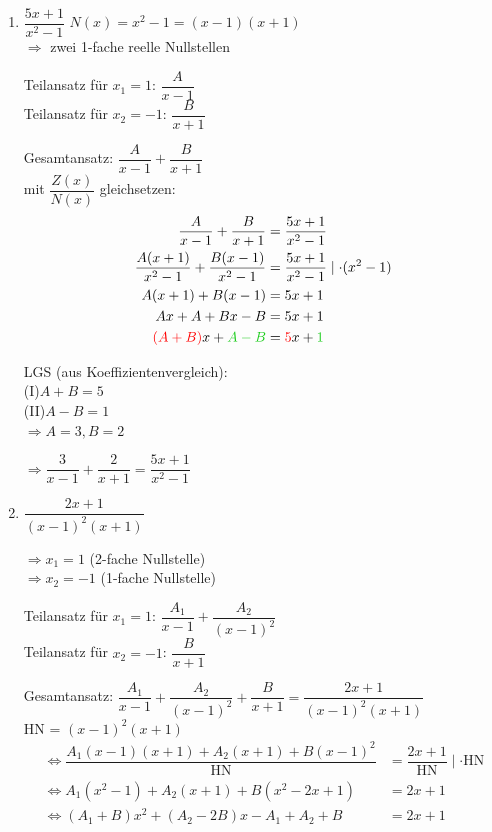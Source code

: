 \Bsp
\begin{enumerate}
	\item $\dfrac{5x+1}{x^2-1}$
	$N(x)=x^2-1=(x-1)(x+1)$\\
	$\Rightarrow$ zwei 1-fache reelle Nullstellen
	
	Teilansatz für $x_1=1$: $\dfrac{A}{x-1}$\\
	Teilansatz für $x_2=-1$: $\dfrac{B}{x+1}$
	
	Gesamtansatz: $\dfrac{A}{x-1}+\dfrac{B}{x+1}$\\
	mit $\dfrac{Z(x)}{N(x)}$ gleichsetzen:
	\begin{align*}
	\dfrac{A}{x-1}+\dfrac{B}{x+1}&=\dfrac{5x+1}{x^2-1}\\
	\dfrac{A(x+1)}{x^2-1}+\dfrac{B(x-1)}{x^2-1}&=\dfrac{5x+1}{x^2-1}\mid\cdot(x^2-1)\\
	A(x+1)+B(x-1)&=5x+1\\
	Ax+A+Bx-B&=5x+1\\
	\red{(A+B)}x+\green{A-B}&=\red{5}x+\green{1}
	\end{align*}
	
	LGS (aus Koeffizientenvergleich):\\
	(I)\quad $A+B=5$\\
	(II)\quad $A-B=1$\\
	$\Rightarrow A=3,B=2$
	
	$\Rightarrow\dfrac{3}{x-1}+\dfrac{2}{x+1}=\dfrac{5x+1}{x^2-1}$\\
	
	\item $\dfrac{2x+1}{(x-1)^2(x+1)}$
	
	$\Rightarrow x_1=1$ (2-fache Nullstelle)\\
	$\Rightarrow x_2=-1$ (1-fache Nullstelle)
	
	Teilansatz für $x_1=1$: $\dfrac{A_1}{x-1}+\dfrac{A_2}{(x-1)^2}$\\
	Teilansatz für $x_2=-1$: $\dfrac{B}{x+1}$
	
	Gesamtansatz: $\dfrac{A_1}{x-1}+\dfrac{A_2}{(x-1)^2}+\dfrac{B}{x+1}=\dfrac{2x+1}{(x-1)^2(x+1)}$\\
	HN = $(x-1)^2(x+1)$
	\begin{align*}
	\Leftrightarrow\dfrac{A_1(x-1)(x+1)+A_2(x+1)+B(x-1)^2}{\text{HN}}&=\dfrac{2x+1}{\text{HN}}\mid\cdot\text{HN}\\
	\Leftrightarrow A_1(x^2-1)+A_2(x+1)+B(x^2-2x+1)&=2x+1\\
	\Leftrightarrow (A_1+B)x^2+(A_2-2B)x-A_1+A_2+B&=2x+1
	\end{align*}
	

\end{enumerate}
